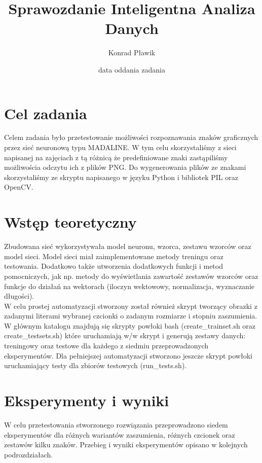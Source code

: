 \documentclass[12pt]{article}
\title{{\bf Sprawozdanie}\linebreak
Inteligentna Analiza Danych}
\author{Konrad Pławik}
\date{data oddania zadania}
\begin{document}
\clearpage\maketitle
\thispagestyle{empty}
\newpage
\setcounter{page}{1}
\section{Cel zadania}

Celem zadania było przetestowanie możliwości rozpoznawania znaków graficznych przez sieć neuronową 
typu MADALINE. W tym celu skorzystaliśmy z sieci napisanej na zajęciach z tą różnicą że predefiniowane znaki zastąpiliśmy możliwościa odczytu ich z plików PNG. Do wygenerowania plików ze znakami skorzystaliśmy ze skryptu napisanego w języku Python i bibliotek PIL oraz OpenCV.\\

\section{Wstęp teoretyczny}

Zbudowana sieć wykorzystywała model neuronu, wzorca, zestawu wzorców oraz model sieci. Model sieci miał zaimplementowane metody treningu oraz testowania. Dodatkowo także utworzenia dodatkowych funkcji i metod pomocniczych, jak np. metody do wyświetlania zawartość zestawów wzorców oraz funkcje do działań na wektorach (iloczyn wektowowy, normalizacja, wyznaczanie długości).\\

\noindent
W celu prostej automatyzacji stworzony został również skrypt tworzący obrazki z zadanymi literami wybranej czcionki o zadanym rozmiarze i stopniu zaszumienia. W głównym katalogu znajdują się skrypty powłoki bash (create\_trainset.sh oraz create\_testsets.sh) które uruchamiają w/w skrypt i generują zestawy danych: treningowy oraz testowe dla każdego z siedmiu przeprowadzonych eksperymentów. Dla pełniejszej automatyzacji stworzono jeszcze skrypt powłoki uruchamiający testy dla zbiorów testowych (run\_tests.sh).\\

\section{Eksperymenty i wyniki}

W celu przetestowania stworzonego rozwiązania przeprowadzono siedem eksperymentów dla różnych wariantów zaszumienia, różnych czcionek oraz zestawów kilku znaków. Przebieg i wyniki eksperymentów opisano w kolejnych podrozdziałach.
\end{document}
